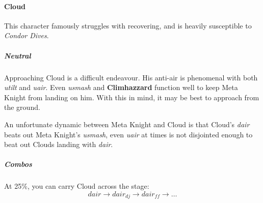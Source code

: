 \paragraph{Cloud}

This character famously struggles with recovering, and is heavily susceptible to \textit{Condor Dives}.

\subparagraph{Neutral}
Approaching Cloud is a difficult endeavour. His anti-air is phenomenal with both \textit{utilt} and \textit{uair}. Even \textit{usmash} and \textbf{Climhazzard} function well to keep Meta Knight from landing on him. With this in mind, it may be best to approach from the ground.

An unfortunate dynamic between Meta Knight and Cloud is that Cloud's \textit{dair} beats out Meta Knight's \textit{usmash}, even \textit{uair} at times is not disjointed enough to beat out Clouds landing with \textit{dair}.

\subparagraph{Combos}
At 25\%, you can carry Cloud across the stage:
\[
	dair \to dair_{dj} \to dair_{ff} \to \hdots
\]